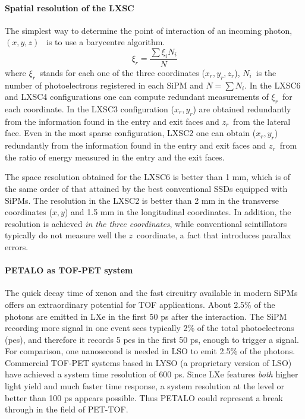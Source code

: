 
\paragraph{Spatial resolution of the LXSC}
The simplest way to determine the point of interaction of an incoming photon, $(x,y,z)$~ is to use a barycentre algorithm. 
\[
\xi_r = \frac{\sum \xi_i N_i}{N}
\]
where $\xi_r$~stands for each one of the three coordinates ($x_r, y_r, z_r$), $N_i$~is the number of photoelectrons registered in each SiPM and $N=\sum N_i$. In the LXSC6 and LXSC4 configurations one can compute redundant measurements of $\xi_r$~for each coordinate. In the LXSC3 configuration ($x_r,y_r$) are obtained redundantly from the information found in the entry and exit faces and $z_r$~from the lateral face. Even in the most sparse configuration, LXSC2 one can obtain ($x_r,y_r$) redundantly from the information found in the entry and exit faces and $z_r$~from the ratio of energy measured in the entry and the exit faces. 

The space resolution obtained for the LXSC6 is better than 1 mm, which is of the same order of that attained by the best conventional SSDs equipped with SiPMs. The resolution in the LXSC2 is better than 2 mm in the transverse coordinates ($x,y$) and 1.5 mm in the longitudinal coordinates.  In addition, the resolution is achieved {\em in the three coordinates}, while conventional scintillators typically do not measure well the $z$~coordinate, a fact that introduces parallax errors. 


\paragraph{PETALO as TOF-PET system}


The quick decay time of xenon and the fast circuitry available in modern SiPMs offers an extraordinary potential for TOF applications. About 2.5\% of the photons are emitted in LXe in the first 50 ps after the interaction. The SiPM recording more signal in one event sees typically  2\% of the total photoelectrons (pes), and therefore it records 5 pes in the first 50 ps, enough to trigger a signal. For comparison, one nanosecond is needed in LSO to emit 2.5\% of the photons. Commercial TOF-PET systems based in LYSO (a proprietary version of LSO) have achieved a system time resolution of 600 ps. Since LXe features {\em both} higher light yield and much faster time response, a system resolution at the level or better than 100 ps appears possible. Thus PETALO could represent a break through in the field of PET-TOF. 


